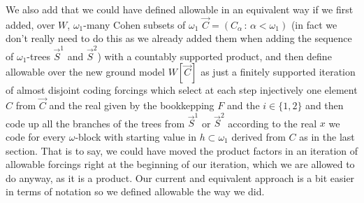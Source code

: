 \documentclass[a4paper,11pt]{article}
\begin{document}
We also add that we could have defined allowable in an equivalent way if  we first added, over $W$,  $\omega_1$-many Cohen subsets of $\omega_1$ $\vec{C}=(C_\alpha \, : \, \alpha < \omega_1)$ (in fact we don't really need to do this as we already added them when adding the sequence of $\omega_1$-trees $\vec{S}^1$ and $\vec{S}^2$) with a countably supported product, and then define allowable over the new ground model $W[\vec{C} ]$ as just a finitely supported iteration of almost disjoint coding forcings which select at each step injectively one element $C$ from $\vec{C}$ and the real given by the bookkepping $F$ and the $i \in \{1,2\}$ and then code up all the branches of the trees from $\vec{S}^1$ or $\vec{S}^2$ according to the real $x$ we code for every $\omega$-block with starting value in $h \subset \omega_1$ derived from $C$ as in the last section. That is to say, we could have moved the product factors in an iteration of allowable forcings right at the beginning of our iteration, which we are allowed to do anyway, as it is a product. 
Our current and equivalent approach is a bit easier in terms of notation so we defined allowable the way we did.
 
\end{document}
